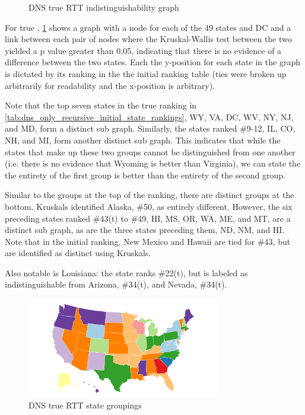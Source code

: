 \begin{figure}
    \centering
    
    \caption{DNS true RTT indistinguishability graph}
    \label{fig:dns_true_rtt_indistinguishable_states_graph}
\end{figure}

For true \rtt, \cref{fig:dns_true_rtt_indistinguishable_states_graph} shows a graph with a node for each of the 49 states and DC and a link between each pair of nodes where the Kruskal-Wallis test between the two yielded a p value greater than 0.05, indicating that there is no evidence of a difference between the two states. Each the y-position for each state in the graph is dictated by its ranking in the the initial ranking table (ties were broken up arbitrarily for readability and the x-position is arbitrary). 

Note that the top seven states in the true \rtt ranking in \cref{tab:dns_only_recursive_initial_state_rankings}, WY, VA, DC, WV, NY, NJ, and MD, form a distinct sub graph. Similarly, the states ranked \#9-12, IL, CO, NH, and MI, form another distinct sub graph. This indicates that while the states that make up these two groups cannot be distinguished from one another (i.e. there is no evidence that Wyoming is better than Virginia), we can state the the entirety of the first group is better than the entirety of the second group.

Similar to the groups at the top of the ranking, there are distinct groups at the bottom. Kruskals identified Alaska, \#50, as entirely different. However, the six preceding states ranked \#43(t) to \#49, HI, MS, OR, WA, ME, and MT, are a distinct sub graph, as are the three states preceding them, ND, NM, and HI. Note that in the initial ranking, New Mexico and Hawaii are tied for \#43, but are identified as distinct using Kruskals.

Also notable is Louisiana: the state ranks \#22(t), but is labeled as indistinguishable from Arizona, \#34(t), and Nevada, \#34(t).

\begin{figure}[htb]
    \centering
    \includegraphics[width=0.75\textwidth]{images/dns/analysis_no_auth_agg/rtt/no_auth_distinct_rtt_map.png}
    \caption{DNS true RTT state groupings}
    \label{fig:dns_true_rtt_indistinguishable_states_map}
\end{figure}

